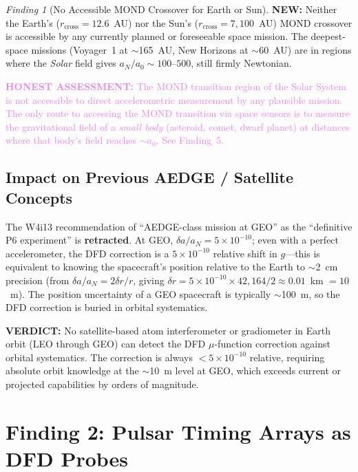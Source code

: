 \documentclass[11pt]{article}
\theoremstyle{definition}
\theoremstyle{remark}
\newtheorem{finding}[theorem]{Finding}
\newcommand{\ee}[1]{\times10^{#1}}
\newcommand{\azero}{a_0}
\newcommand{\honest}[1]{\textcolor{violet}{\textbf{HONEST ASSESSMENT:} #1}}
\newcommand{\newresult}[1]{\textcolor{green!50!black}{\textbf{NEW:} #1}}
\newcommand{\verdict}[1]{\textcolor{green!50!black}{\textbf{VERDICT:} #1}}
\begin{document}
\begin{finding}[No Accessible MOND Crossover for Earth or Sun]
\label{find:no-crossover}
\newresult{Neither the Earth's ($r_{\mathrm{cross}} = 12.6$~AU) nor
the Sun's ($r_{\mathrm{cross}} = 7{,}100$~AU) MOND crossover is
accessible by any currently planned or foreseeable space mission.
The deepest-space missions (Voyager~1 at $\sim$165~AU, New Horizons
at $\sim$60~AU) are in regions where the \emph{Solar} field gives
$a_N / \azero \sim 100$--$500$, still firmly Newtonian.}

\honest{The MOND transition region of the Solar System is not accessible
to direct accelerometric measurement by any plausible mission. The only
route to accessing the MOND transition via space sensors is to measure
the gravitational field of a \emph{small body} (asteroid, comet, dwarf
planet) at distances where that body's field reaches $\sim \azero$.
See Finding~5.}
\end{finding}

\subsection{Impact on Previous AEDGE / Satellite Concepts}

The W4i13 recommendation of ``AEDGE-class mission at GEO'' as the
``definitive P6 experiment'' is \textbf{retracted}. At GEO,
$\delta a / a_N = 5\ee{-10}$; even with a perfect accelerometer,
the DFD correction is a $5\ee{-10}$ relative shift in $g$---this
is equivalent to knowing the spacecraft's position relative to the
Earth to $\sim$2~cm precision (from $\delta a / a_N = 2 \delta r / r$,
giving $\delta r = 5\ee{-10} \times 42{,}164 / 2 \approx 0.01$~km
$= 10$~m). The position uncertainty of a GEO spacecraft is typically
$\sim$100~m, so the DFD correction is buried in orbital systematics.

\verdict{No satellite-based atom interferometer or gradiometer in
Earth orbit (LEO through GEO) can detect the DFD $\mu$-function
correction against orbital systematics. The correction is always
$< 5\ee{-10}$ relative, requiring absolute orbit knowledge at
the $\sim$10~m level at GEO, which exceeds current or projected
capabilities by orders of magnitude.}

\section{Finding 2: Pulsar Timing Arrays as DFD Probes}
\label{sec:pta}
\end{document}
